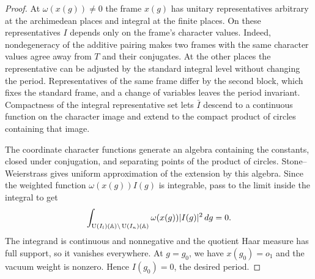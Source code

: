 \begin{proof}
At $\omega(x(g))\ne0$ the frame $x(g)$ has unitary representatives arbitrary at the archimedean places and integral at the finite places. On these representatives $I$ depends only on the frame's character values. Indeed, nondegeneracy of the additive pairing makes two frames with the same character values agree away from $T$ and their conjugates. At the other places the representative can be adjusted by the standard integral level without changing the period. Representatives of the same frame differ by the second block, which fixes the standard frame, and a change of variables leaves the period invariant. Compactness of the integral representative set lets $\bar I$ descend to a continuous function on the character image and extend to the compact product of circles containing that image.

The coordinate character functions generate an algebra containing the constants, closed under conjugation, and separating points of the product of circles. Stone--Weierstrass gives uniform approximation of the extension by this algebra. Since the weighted function $\omega(x(g))I(g)$ is integrable, pass to the limit inside the integral to get
\[
 \int_{\operatorname{U}(I_l)(\mathbb A)\backslash \operatorname{U}(I_n)(\mathbb A)}
              \omega(x(g))|I(g)|^2\,dg=0 .
\]
The integrand is continuous and nonnegative and the quotient Haar measure has full support, so it vanishes everywhere. At $g=g_0$, we have $x(g_0)=o_1$ and the vacuum weight is nonzero. Hence $I(g_0)=0$, the desired period.
\end{proof}

